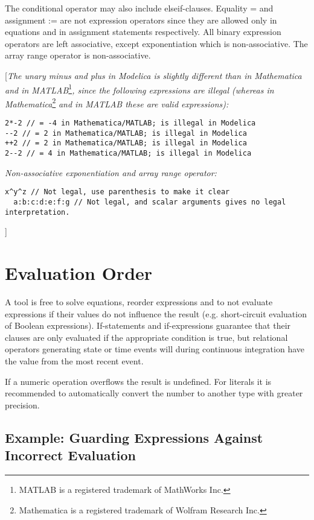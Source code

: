 The conditional operator may also include elseif-clauses. Equality = and
assignment := are not expression operators since they are allowed only
in equations and in assignment statements respectively. All binary
expression operators are left associative, except exponentiation which
is non-associative. The array range operator is non-associative.

{[}\emph{The unary minus and plus in Modelica is slightly different than
in Mathematica and in MATLAB}\footnote{MATLAB is a registered trademark
  of MathWorks Inc.}\emph{, since the following expressions are illegal
(whereas in Mathematica}\footnote{Mathematica is a registered trademark
  of Wolfram Research Inc.} \emph{and in MATLAB these are valid
expressions):}
\begin{lstlisting}[language=modelica]
2*-2 // = -4 in Mathematica/MATLAB; is illegal in Modelica
--2 // = 2 in Mathematica/MATLAB; is illegal in Modelica
++2 // = 2 in Mathematica/MATLAB; is illegal in Modelica
2--2 // = 4 in Mathematica/MATLAB; is illegal in Modelica
\end{lstlisting}

\emph{Non-associative exponentiation and array range operator:}

\begin{lstlisting}[language=modelica]
  x^y^z // Not legal, use parenthesis to make it clear
  a:b:c:d:e:f:g // Not legal, and scalar arguments gives no legal interpretation.
\end{lstlisting}
{]}

\section{Evaluation Order}

A tool is free to solve equations, reorder expressions and to not
evaluate expressions if their values do not influence the result (e.g.
short-circuit evaluation of Boolean expressions). If-statements and
if-expressions guarantee that their clauses are only evaluated if the
appropriate condition is true, but relational operators generating state
or time events will during continuous integration have the value from
the most recent event.

If a numeric operation overflows the result is undefined. For literals
it is recommended to automatically convert the number to another type
with greater precision.

\subsection{Example: Guarding Expressions Against Incorrect Evaluation}

